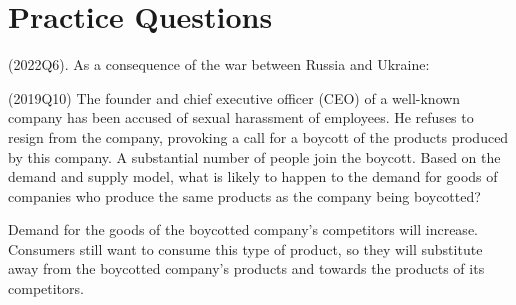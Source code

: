 \documentclass{exam}
\begin{document}
\section{Practice Questions}

\begin{questions}

\question (2022Q6). As a consequence of the war between Russia and Ukraine:


\question (2019Q10) The founder and chief executive officer (CEO) of a well-known company has been accused of sexual harassment of employees. He refuses to resign from the company, provoking a call for a boycott of the products produced by this company. A substantial number of people join the boycott. Based on the demand and supply model, what is likely to happen to the demand for goods of companies who produce the same products as the company being boycotted?
\begin{solution}
    Demand for the goods of the boycotted company's competitors will increase. Consumers still want to consume this type of product, so they will substitute away from the boycotted company's products and towards the products of its competitors.
\end{solution}


\end{questions}
\end{document}
